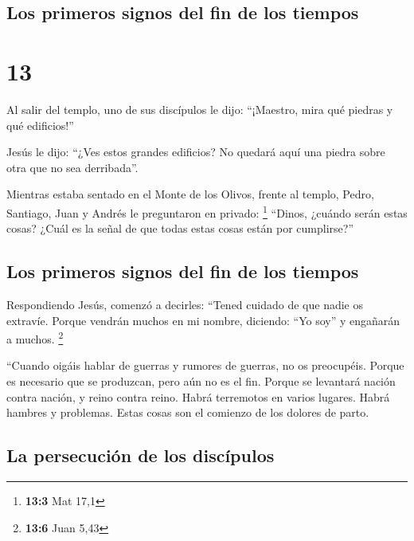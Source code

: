 \begin{paracol}{2}
\hypertarget{los-primeros-signos-del-fin-de-los-tiempos}{%
\subsection{Los primeros signos del fin de los
tiempos}\label{los-primeros-signos-del-fin-de-los-tiempos}}

\hypertarget{section-23}{%
\section{13}\label{section-23}}

 Al salir del templo, uno de sus discípulos le dijo:
``¡Maestro, mira qué piedras y qué edificios!''

 Jesús le dijo: ``¿Ves estos grandes edificios? No quedará
aquí una piedra sobre otra que no sea derribada''.

 Mientras estaba sentado en el Monte de los Olivos, frente
al templo, Pedro, Santiago, Juan y Andrés le preguntaron en privado:
\footnote{\textbf{13:3} Mat 17,1}  ``Dinos, ¿cuándo serán
estas cosas? ¿Cuál es la señal de que todas estas cosas están por
cumplirse?''

\hypertarget{los-primeros-signos-del-fin-de-los-tiempos-1}{%
\subsection{Los primeros signos del fin de los
tiempos}\label{los-primeros-signos-del-fin-de-los-tiempos-1}}

 Respondiendo Jesús, comenzó a decirles: ``Tened cuidado
de que nadie os extravíe.  Porque vendrán muchos en mi
nombre, diciendo: ``Yo soy'' y engañarán a muchos. \footnote{\textbf{13:6}
  Juan 5,43}

 ``Cuando oigáis hablar de guerras y rumores de guerras,
no os preocupéis. Porque es necesario que se produzcan, pero aún no es
el fin.  Porque se levantará nación contra nación, y reino
contra reino. Habrá terremotos en varios lugares. Habrá hambres y
problemas. Estas cosas son el comienzo de los dolores de parto.

\hypertarget{la-persecuciuxf3n-de-los-discuxedpulos}{%
\subsection{La persecución de los
discípulos}\label{la-persecuciuxf3n-de-los-discuxedpulos}}


\end{paracol}

